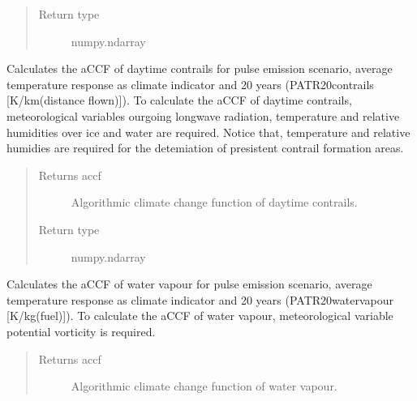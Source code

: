 \documentclass[a4paper,11pt,english]{sphinxmanual}
\begin{document}
\begin{fulllineitems}
\begin{fulllineitems}
\begin{quote}
\begin{description}
\item[{Return type}] \leavevmode
numpy.ndarray

\end{description}\end{quote}

\end{fulllineitems}


\begin{fulllineitems}
\label{\detokenize{modules:envlib.accf.GeTaCCFs.accf_dcontrail}}
Calculates the aCCF of day\sphinxhyphen{}time contrails for pulse emission scenario, average temperature response as
climate indicator and 20 years (P\sphinxhyphen{}ATR20\sphinxhyphen{}contrails {[}K/km(distance flown){]}). To calculate the aCCF of day\sphinxhyphen{}time contrails,
meteorological variables ourgoing longwave radiation, temperature and relative humidities over ice and water
are required. Notice that, temperature and relative humidies are required for the detemiation of presistent
contrail formation areas.
\begin{quote}\begin{description}
\item[{Returns accf}] \leavevmode
Algorithmic climate change function of day\sphinxhyphen{}time contrails.

\item[{Return type}] \leavevmode
numpy.ndarray

\end{description}\end{quote}

\end{fulllineitems}


\begin{fulllineitems}
\label{\detokenize{modules:envlib.accf.GeTaCCFs.accf_h2o}}
Calculates the aCCF of water vapour for pulse emission scenario, average temperature response as
climate indicator and 20 years (P\sphinxhyphen{}ATR20\sphinxhyphen{}water\sphinxhyphen{}vapour {[}K/kg(fuel){]}). To calculate the aCCF of water vapour,
meteorological variable potential vorticity is required.
\begin{quote}\begin{description}
\item[{Returns accf}] \leavevmode
Algorithmic climate change function of water vapour.


\end{description}
\end{quote}
\end{fulllineitems}
\end{fulllineitems}
\end{document}
